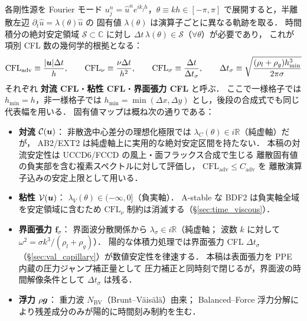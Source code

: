 各剛性源を Fourier モード $u_j^n = \hat{u}^n e^{ik_j h}$，$\theta\equiv kh\in[-\pi,\pi]$
で展開すると，半離散左辺 $\partial_t \hat{u} = \lambda(\theta)\hat{u}$ の
固有値 $\lambda(\theta)$ は演算子ごとに異なる軌跡を取る．
時間積分の絶対安定領域 $\mathcal{S}\subset\mathbb{C}$ に対し
$\Delta t\,\lambda(\theta)\in\mathcal{S}$（$\forall\theta$）が必要であり，
これが項別 CFL 数の幾何学的根拠となる：
\begin{equation}
  \mathrm{CFL}_{\mathrm{adv}} \equiv \frac{|\bm{u}|\Delta t}{h},\qquad
  \mathrm{CFL}_{\nu} \equiv \frac{\nu\Delta t}{h^2},\qquad
  \mathrm{CFL}_{\sigma} \equiv \frac{\Delta t}{\Delta t_\sigma},\qquad
  \Delta t_\sigma \equiv
  \sqrt{\frac{(\rho_l+\rho_g)h_{\min}^3}{2\pi\sigma}}
  \label{eq:cfl_number}
\end{equation}
それぞれ \textbf{対流 CFL}・\textbf{粘性 CFL}・\textbf{界面張力 CFL} と呼ぶ．
ここで一様格子では $h_{\min}=h$，非一様格子では
$h_{\min}=\min(\Delta x,\Delta y)$ とし，後段の合成式でも同じ代表幅を用いる．
固有値マップは概ね次の通りである：
\begin{itemize}[leftmargin=2em]
  \item \textbf{対流 $\mathcal{C}(\bm{u})$}：
        非散逸中心差分の理想化極限では $\lambda_C(\theta)\in i\mathbb{R}$（純虚軸）だが，
        AB2/EXT2 は純虚軸上に実用的な絶対安定区間を持たない．
        本稿の対流安定性は UCCD6/FCCD の風上・面フラックス合成で生じる
        離散固有値の負実部を含む複素スペクトルに対して評価し，
        $\mathrm{CFL}_{\mathrm{adv}}\le C_{\mathrm{adv}}$ を
        離散演算子込みの安定上限として用いる．
  \item \textbf{粘性 $\mathcal{V}(\bm{u})$}：
        $\lambda_V(\theta)\in(-\infty,0]$（負実軸）．
        A-stable な BDF2 は負実軸全域を安定領域に含むため
        $\mathrm{CFL}_{\nu}$ 制約は消滅する（§\ref{sec:time_viscous}）．
  \item \textbf{界面張力 $\bm{f}_\sigma$}：
        界面波分散関係から $\lambda_\sigma\in i\mathbb{R}$（純虚軸；
        波数 $k$ に対して $\omega^2 = \sigma k^3/(\rho_l+\rho_g)$）．
        陽的な体積力処理では界面張力 CFL $\Delta t_\sigma$
        （§\ref{sec:val_capillary}）が数値安定性を律速する．
        本稿は表面張力を PPE 内蔵の圧力ジャンプ補正量として
        圧力補正と同時刻で閉じるが，界面波の時間解像条件として
        $\Delta t_\sigma$ は残る．
  \item \textbf{浮力 $\rho\bm{g}$}：
        重力波 $N_{\mathrm{BV}}$（Brunt--Väisälä）由来；
        Balanced--Force 浮力分解により残差成分のみが陽的に時間刻み制約を生む．
\end{itemize}


